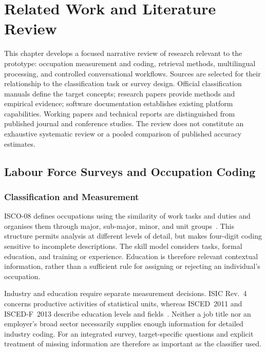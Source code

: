 \chapter{Related Work and Literature Review}
\label{chap:relatedwork}

This chapter develops a focused narrative review of research relevant to
the prototype: occupation measurement and coding, retrieval methods,
multilingual processing, and controlled conversational workflows.
Sources are selected for their relationship to the classification task
or survey design. Official classification manuals define the target
concepts; research papers provide methods and empirical evidence;
software documentation establishes existing platform capabilities.
Working papers and technical reports are distinguished from published
journal and conference studies. The review does not constitute an
exhaustive systematic review or a pooled comparison of published
accuracy estimates.

\section{Labour Force Surveys and Occupation Coding}
\label{sec:rw-lfs}

\subsection{Classification and Measurement}

ISCO-08 defines occupations using the similarity of work tasks and duties
and organises them through major, sub-major, minor, and unit
groups~\cite{ilo2012isco_v1}. This structure permits analysis at different
levels of detail, but makes four-digit coding sensitive to incomplete
descriptions. The skill model considers tasks, formal education, and
training or experience. Education is therefore relevant contextual
information, rather than a sufficient rule for assigning or rejecting an
individual's occupation.

Industry and education require separate measurement decisions. ISIC
Rev.~4 concerns productive activities of statistical units, whereas
ISCED~2011 and ISCED-F~2013 describe education levels and
fields~\cite{unsd2008isic,unesco2012isced,unesco2015iscedf}.
Neither a job title nor an employer's broad sector necessarily supplies
enough information for detailed industry coding. For an integrated
survey, target-specific questions and explicit treatment of missing
information are therefore as important as the classifier used.

